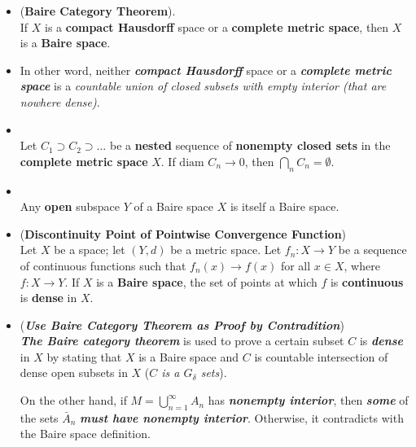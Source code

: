 \documentclass[11pt]{article}
\begin{document}
\begin{itemize}
\item \begin{theorem} (\textbf{Baire Category Theorem}).  \citep{munkres2000topology} \\
If $X$ is a \textbf{compact Hausdorff} space or a \textbf{complete metric space}, then $X$ is a \textbf{Baire space}.
\end{theorem}

\item \begin{remark}
In other word,  neither \textbf{\emph{compact Hausdorff}} space or a \textbf{\emph{complete metric space}} is a \emph{countable union of closed subsets with empty interior (that are nowhere dense)}.
\end{remark}

\item \begin{lemma}\citep{munkres2000topology} \\
Let $C_1 \supset C_2 \supset \ldots$ be a \textbf{nested} sequence of \textbf{nonempty closed sets} in the \textbf{complete metric space} $X$. If $\text{diam }C_n \rightarrow 0$, then $\bigcap_{n}C_n  = \emptyset$.
\end{lemma}

\item \begin{lemma} \citep{munkres2000topology} \\
Any \textbf{open} subspace $Y$ of a Baire space $X$ is itself a Baire space.
\end{lemma}

\item \begin{theorem} (\textbf{Discontinuity Point of Pointwise Convergence Function}) \citep{munkres2000topology} \\
Let $X$ be a space; let $(Y, d)$ be a metric space. Let $f_n : X \rightarrow Y$ be a sequence of continuous functions such that $f_n(x) \rightarrow f(x)$ for all $x \in X$, where $f : X \rightarrow Y$. If $X$ is a \textbf{Baire space}, the set of points at which $f$ is \textbf{continuous} is \textbf{dense} in $X$.
\end{theorem}

\item \begin{remark} (\textbf{\emph{Use Baire Category Theorem as Proof by Contradition}})\\
\emph{\textbf{The Baire category theorem}} is used to prove a certain subset $C$ is \emph{\textbf{dense}} in $X$ by stating that $X$ is a Baire space and $C$ is countable intersection of dense open subsets in $X$ (\emph{$C$ is a $G_{\delta}$ sets}). 

On the other hand, if $M =  \bigcup_{n=1}^{\infty}A_n$ has \emph{\textbf{nonempty interior}}, then \emph{\textbf{some}} of the  sets $\bar{A}_n$ \emph{\textbf{must have nonempty interior}}. Otherwise, it contradicts with the Baire space definition.
\end{remark}
\end{itemize}

\newpage


\end{document}
